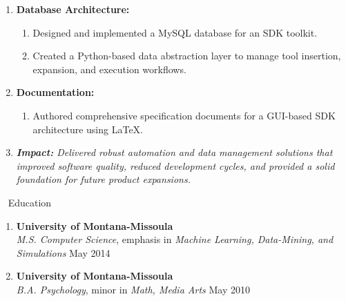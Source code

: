 \documentclass[oneside]{article}%
\begin{document}
\begin{enumerate}[]
\begin{enumerate}[]
			\begin{enumerate}[-]
				\item Created a GUI-based test automation application using Python (GTK).
				\item Wrote architectural specifications in \LaTeX\ to ensure clarity and maintainability.
			\end{enumerate}
		\item \textbf{Database Architecture:}
			\begin{enumerate}[-]
				\item Designed and implemented a MySQL database for an SDK toolkit.
				\item Created a Python-based data abstraction layer to manage tool insertion, expansion, and execution workflows.
			\end{enumerate}
		\item \textbf{Documentation:}
			\begin{enumerate}[-]
				\item Authored comprehensive specification documents for a GUI-based SDK architecture using \LaTeX.
			\end{enumerate}
	\item \textit{\textbf{Impact:} Delivered robust automation and data management solutions that improved software quality, reduced development cycles, 
	and provided a solid foundation for future product expansions.}
	\end{enumerate}
\end{enumerate}
\
\noindent
\huge{Education}
\small
\begin{enumerate}[]
\item \textbf{University of Montana-Missoula}\\
	\textit{M.S. Computer Science}, emphasis in \textit{Machine Learning, Data-Mining, and Simulations} \hfill May 2014
\item \textbf{University of Montana-Missoula}\\
	\textit{B.A. Psychology}, minor in \textit{Math, Media Arts} \hfill May 2010
	\
\end{enumerate}
\
\end{document}
